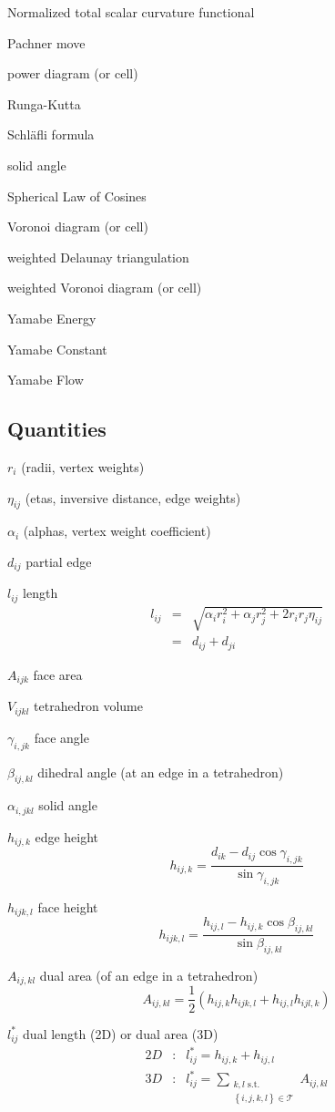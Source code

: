 \documentclass{article}
\begin{document}
Normalized total scalar curvature functional

Pachner move

power diagram (or cell)

Runga-Kutta

Schl\"{a}fli formula

solid angle

Spherical Law of Cosines

Voronoi diagram (or cell)

weighted Delaunay triangulation

weighted Voronoi diagram (or cell)

Yamabe Energy

Yamabe Constant

Yamabe Flow

\bigskip 

\subsection{Quantities}

$r_{i}$ (radii, vertex weights)

$\eta _{ij}$ (etas, inversive distance, edge weights)

$\alpha _{i}$ (alphas, vertex weight coefficient)

$d_{ij}$ partial edge

$l_{ij}$ length%
\begin{eqnarray*}
l_{ij} &=&\sqrt{\alpha _{i}r_{i}^{2}+\alpha _{j}r_{j}^{2}+2r_{i}r_{j}\eta
_{ij}} \\
&=&d_{ij}+d_{ji}
\end{eqnarray*}

$A_{ijk}$ face area

$V_{ijkl}$ tetrahedron volume

$\gamma _{i,jk}$ face angle

$\beta _{ij,kl}$ dihedral angle (at an edge in a tetrahedron)

$\alpha _{i,jkl}$ solid angle

$h_{ij,k}$ edge height%
\[
h_{ij,k}=\frac{d_{ik}-d_{ij}\cos \gamma _{i,jk}}{\sin \gamma _{i,jk}}
\]

$h_{ijk,l}$ face height%
\[
h_{ijk,l}=\frac{h_{ij,l}-h_{ij,k}\cos \beta _{ij,kl}}{\sin \beta _{ij,kl}}
\]

$A_{ij,kl}$ dual area (of an edge in a tetrahedron)%
\[
A_{ij,kl}=\frac{1}{2}\left( h_{ij,k}h_{ijk,l}+h_{ij,l}h_{ijl,k}\right) 
\]

$l_{ij}^{\ast }$ dual length (2D) or dual area (3D) 
\begin{eqnarray*}
2D &:&l_{ij}^{\ast }=h_{ij,k}+h_{ij,l} \\
3D &:&l_{ij}^{\ast }=\sum_{\substack{ k,l\text{ s.t.} \\ \left\{
i,j,k,l\right\} \in \mathcal{T}}}A_{ij,kl}
\end{eqnarray*}
\end{document}
